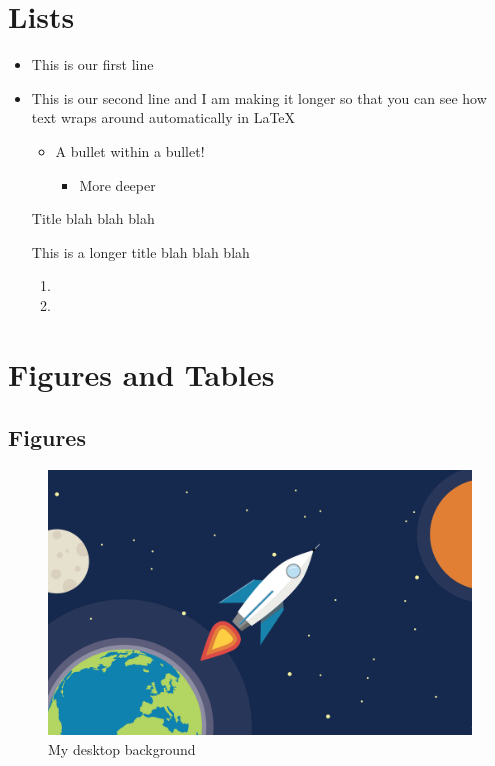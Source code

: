 \documentclass{article}
\begin{document}
\section{Lists}
\begin{itemize}
	\item This is our first line
	\item This is our second line and I am making it longer so that you can see how text wraps around automatically in \LaTeX
	\begin{itemize}
		\item A bullet within a bullet!
		\begin{itemize}
			\item More deeper
		\end{itemize}
	\end{itemize}
	\item [Title] blah blah blah
	\item [This is a longer title] blah blah blah
	\begin{enumerate}
		\item \lipsum[1]
		\item \lipsum[2]
	\end{enumerate}
\end{itemize}

\cleardoublepage
\section{Figures and Tables}
\subsection{Figures}
\begin{figure}[H]
	\centering
	\includegraphics[width = \textwidth]{Figures/space.png}
	\caption{My desktop background}
	\label{fig}
\end{figure}
\end{document}
